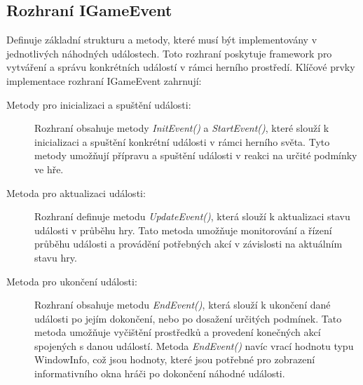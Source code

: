 \subsection{Rozhraní IGameEvent}
Definuje základní strukturu a metody, které musí být implementovány v jednotlivých náhodných událostech. Toto rozhraní poskytuje framework pro vytváření a správu konkrétních událostí v rámci herního prostředí. Klíčové prvky implementace rozhraní IGameEvent zahrnují:
\begin{description}
	\item[Metody pro inicializaci a spuštění události:] Rozhraní obsahuje metody \textit{InitEvent()} a \textit{StartEvent()}, které slouží k inicializaci a spuštění konkrétní události v rámci herního světa. Tyto metody umožňují přípravu a spuštění události v reakci na určité podmínky ve hře.
	\item[Metoda pro aktualizaci události:] Rozhraní definuje metodu \textit{UpdateEvent()}, která slouží k aktualizaci stavu události v průběhu hry. Tato metoda umožňuje monitorování a řízení průběhu události a provádění potřebných akcí v závislosti na aktuálním stavu hry.
	\item[Metoda pro ukončení události:] Rozhraní obsahuje metodu \textit{EndEvent()}, která slouží k ukončení dané události po jejím dokončení, nebo po dosažení určitých podmínek. Tato metoda umožňuje vyčištění prostředků a provedení konečných akcí spojených s danou událostí. Metoda \textit{EndEvent()} navíc vrací hodnotu typu WindowInfo, což jsou hodnoty, které jsou potřebné pro zobrazení informativního okna hráči po dokončení náhodné události.
\end{description}

